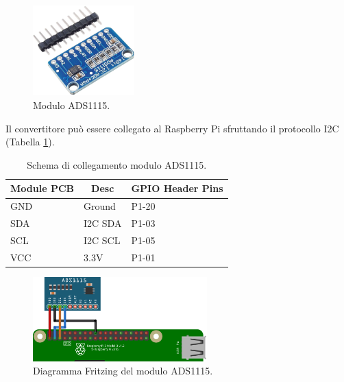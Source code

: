 \begin{figure}[H]
    \centering
    \includegraphics[width=0.35\textwidth]{images/sensors/ads1115.png}\hfill
    \caption{Modulo ADS1115.}
\end{figure}
Il convertitore può essere collegato al Raspberry Pi sfruttando il protocollo I2C (Tabella \ref*{tb-ADS1115-conn-schema}).
\begin{table}[H]
    \centering
    \begin{tabular}{|l|l|l|}
    \hline
    \multicolumn{1}{|c|}{\textbf{Module PCB}} & \multicolumn{1}{c|}{\textbf{Desc}} & \multicolumn{1}{c|}{\textbf{GPIO Header Pins}} \\ \hline
    GND                                       & Ground                             & P1-20                                          \\ \hline
    SDA                                       & I2C SDA                            & P1-03                                          \\ \hline
    SCL                                       & I2C SCL                            & P1-05                                          \\ \hline
    VCC                                       & 3.3V                               & P1-01                                          \\ \hline
    \end{tabular}
    \caption{\label{tb-ADS1115-conn-schema}Schema di collegamento modulo ADS1115.}
\end{table}

\begin{figure}[H]
    \begin{center}
      \includegraphics[width=0.6\textwidth]{images/sensors/ads1115-fritzing.png}
    \end{center}
    \caption{\label{ads1115-diagram}Diagramma Fritzing del modulo ADS1115.}
\end{figure}

